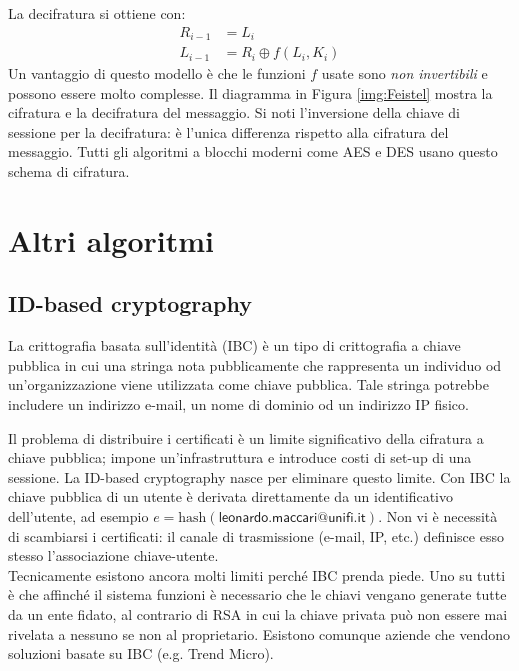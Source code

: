 La decifratura si ottiene con:
\begin{align*}
	R_{i-1} &= L_i \\
	L_{i-1} &= R_i \oplus f(L_i, K_i)
\end{align*}
Un vantaggio di questo modello è che le funzioni $f$ usate sono \textit{non invertibili} e possono essere molto complesse. Il diagramma in Figura \ref{img:Feistel} mostra la cifratura e la decifratura del messaggio. Si noti l'inversione della chiave di sessione per la decifratura: è l'unica differenza rispetto alla cifratura del messaggio. Tutti gli algoritmi a blocchi moderni come AES e DES usano questo schema di cifratura.

\section{Altri algoritmi}

\subsection{ID-based cryptography}
La crittografia basata sull'identità (IBC) è un tipo di crittografia a chiave pubblica in cui una stringa nota pubblicamente che rappresenta un individuo od un'organizzazione viene utilizzata come chiave pubblica. Tale stringa potrebbe includere un indirizzo e-mail, un nome di dominio od un indirizzo IP fisico.

Il problema di distribuire i certificati è un limite significativo della cifratura a chiave pubblica; impone un'infrastruttura e introduce costi di set-up di una sessione. La ID-based cryptography nasce per eliminare questo limite. Con IBC la chiave pubblica di un utente è derivata direttamente da un identificativo dell'utente, ad esempio $e=\text{hash}(\textsf{leonardo.maccari@unifi.it})$. Non vi è necessità di scambiarsi i certificati: il canale di trasmissione (e-mail, IP, etc.) definisce esso stesso l'associazione chiave-utente.\\
Tecnicamente esistono ancora molti limiti perché IBC prenda piede. Uno su tutti è che affinché il sistema funzioni è necessario che le chiavi vengano generate tutte da un ente fidato, al contrario di RSA in cui la chiave privata può non essere mai rivelata a nessuno se non al proprietario. Esistono comunque aziende che vendono soluzioni basate su IBC (e.g. Trend Micro).

